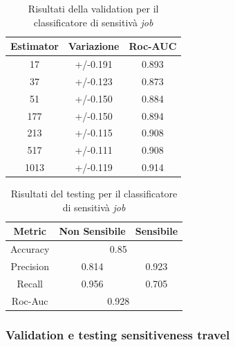 \begin{table}[h]

\centering
\begin{tabular}{|c|c|c|}
\hline
\textbf{Estimator} & \textbf{Variazione} & \textbf{Roc-AUC} \\ \hline
17 & +/-0.191 & 0.893 \\ \hline
37 & +/-0.123 & 0.873 \\ \hline
51 & +/-0.150 & 0.884 \\ \hline
177 & +/-0.150 & 0.894 \\ \hline
213 & +/-0.115 & 0.908 \\ \hline
517 & +/-0.111 & 0.908 \\ \hline
1013 & +/-0.119 & 0.914 \\ \hline
\end{tabular}
\caption{Risultati della validation per il classificatore di sensitivà \textit{job}}
\label{tbl:val_sens_job}
\end{table}
\FloatBarrier

\begin{table}[h]

\centering
\begin{tabular}{|c|c|c|}
\hline
\textbf{Metric} & \textbf{Non Sensibile} & \textbf{Sensibile} \\ \hline
Accuracy & \multicolumn{2}{c|}{0.85} \\ \hline
Precision & 0.814 & 0.923 \\ \hline
Recall & 0.956 & 0.705 \\ \hline
Roc-Auc & \multicolumn{2}{c|}{0.928} \\ \hline
\end{tabular}
\caption{Risultati del testing per il classificatore di sensitivà \textit{job}}
\label{tbl:training_sens_job}
\end{table}
\FloatBarrier


\subsubsection{Validation e testing sensitiveness travel}
\label{sssec:val_testing_travel}

